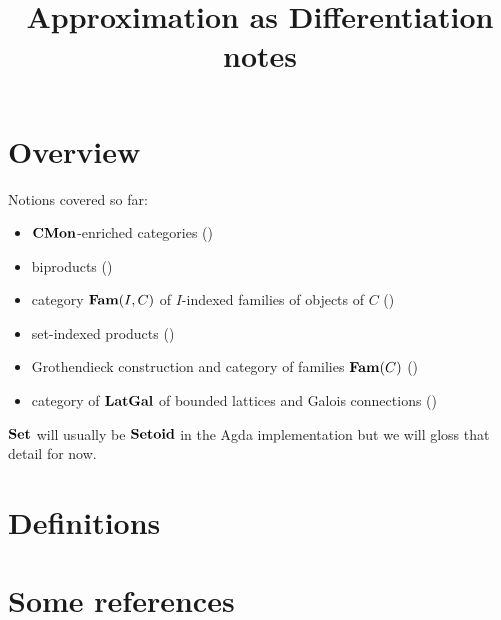 \documentclass[acmsmall,nonacm]{acmart}
\begin{document}
\title{Approximation as Differentiation notes}
\maketitle

\section{Overview}

Notions covered so far:
\begin{itemize}
\item $\mathbf{CMon}$-enriched categories ()
\item biproducts ()
\item category $\mathbf{Fam}(I,C)$ of $I$-indexed families of objects of $C$ ()
\item set-indexed products ()
\item Grothendieck construction and category of families $\mathbf{Fam}(C)$ ()
\item category of $\mathbf{LatGal}$ of bounded lattices and Galois connections ()
\end{itemize}

\noindent $\mathbf{Set}$ will usually be $\mathbf{Setoid}$ in the Agda implementation but we will gloss that detail for now.



\section{Definitions}








% 

\section{Some references}

\cite{karvonen2020}



\end{document}
